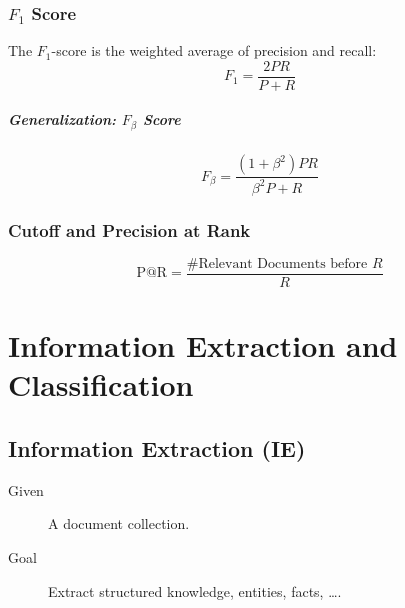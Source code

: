 		\subsection{\( F _ 1 \) Score} %
			The \(F_1\)-score is the weighted average of precision and recall:
			\begin{equation*}
				F_1 = \frac{2PR}{P + R} \tag{Harmonic Mean of \(P\) and \(R\)}
			\end{equation*}

			\paragraph{Generalization: \( F _ \beta \) Score}
				\begin{equation*}
					F _ \beta = \frac{(1 + \beta^2) P R}{\beta^2 P + R}
				\end{equation*}

		\subsection{Cutoff and Precision at Rank} %
			\begin{equation*}
				\text{P@R} = \frac{\text{\#Relevant Documents before } R}{R} \tag{Precision at Rank}
			\end{equation*}

\chapter{Information Extraction and Classification} %
	\section{Information Extraction (IE)} %
		\begin{description}
			\item[Given] A document collection.
			\item[Goal] Extract structured knowledge, entities, facts, \dots.
		\end{description}

